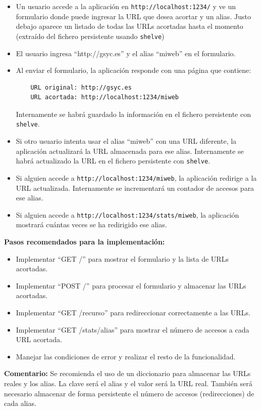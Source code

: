 \begin{itemize}
    \item Un usuario accede a la aplicación en \texttt{http://localhost:1234/} y ve un formulario donde puede ingresar la URL que desea acortar y un alias. Justo debajo aparece un listado de todas las URLs acortadas hasta el momento (extraído del fichero persistente usando \texttt{shelve})
    \item El usuario ingresa ``http://gsyc.es'' y el alias ``miweb'' en el formulario.
    \item Al enviar el formulario, la aplicación responde con una página que contiene:
    \begin{verbatim}
    URL original: http://gsyc.es
    URL acortada: http://localhost:1234/miweb
    \end{verbatim}
    Internamente se habrá guardado la información en el fichero persistente con \texttt{shelve}.
    \item Si otro usuario intenta usar el alias ``miweb'' con una URL diferente, la aplicación actualizará la URL almacenada para ese alias. Internamente se habrá actualizado la URL en el fichero persistente con \texttt{shelve}.
    \item Si alguien accede a \texttt{http://localhost:1234/miweb}, la aplicación redirige a la URL actualizada. Internamente se incrementará un contador de accesos para ese alias.
    \item Si alguien accede a \texttt{http://localhost:1234/stats/miweb}, la aplicación mostrará cuántas veces se ha redirigido ese alias.
\end{itemize}

\textbf{Pasos recomendados para la implementación:}

\begin{itemize}
    \item Implementar ``GET /'' para mostrar el formulario y la lista de URLs acortadas.
    \item Implementar ``POST /'' para procesar el formulario y almacenar las URLs acortadas.
    \item Implementar ``GET /recurso'' para redireccionar correctamente a las URLs.
    \item Implementar ``GET /stats/alias'' para mostrar el número de accesos a cada URL acortada.
    \item Manejar las condiciones de error y realizar el resto de la funcionalidad.
\end{itemize}

\textbf{Comentario:} Se recomienda el uso de un diccionario para almacenar las URLs reales y los alias. La clave será el alias y el valor será la URL real. También será necesario almacenar de forma persistente el número de accesos (redirecciones) de cada alias.

